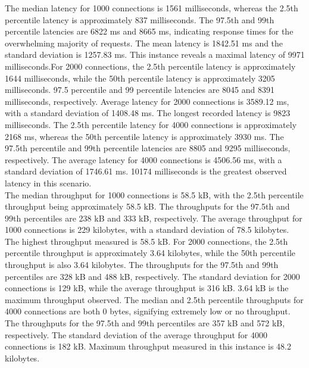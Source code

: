 \documentclass[../Main.tex]{subfiles}
\begin{document}
The median latency for 1000 connections is 1561 milliseconds, whereas the 2.5th percentile latency is approximately 837 milliseconds. The 97.5th and 99th percentile latencies are 6822 ms and 8665 ms, indicating response times for the overwhelming majority of requests. The mean latency is 1842.51 ms and the standard deviation is 1257.83 ms. This instance reveals a maximal latency of 9971 milliseconds.For 2000 connections, the 2.5th percentile latency is approximately 1644 milliseconds, while the 50th percentile latency is approximately 3205 milliseconds. 97.5 percentile and 99 percentile latencies are 8045 and 8391 milliseconds, respectively. Average latency for 2000 connections is 3589.12 ms, with a standard deviation of 1408.48 ms. The longest recorded latency is 9823 milliseconds. The 2.5th percentile latency for 4000 connections is approximately 2168 ms, whereas the 50th percentile latency is approximately 3930 ms. The 97.5th percentile and 99th percentile latencies are 8805 and 9295 milliseconds, respectively. The average latency for 4000 connections is 4506.56 ms, with a standard deviation of 1746.61 ms. 10174 milliseconds is the greatest observed latency in this scenario.\\
\indent The median throughput for 1000 connections is 58.5 kB, with the 2.5th percentile throughput being approximately 58.5 kB. The throughputs for the 97.5th and 99th percentiles are 238 kB and 333 kB, respectively. The average throughput for 1000 connections is 229 kilobytes, with a standard deviation of 78.5 kilobytes. The highest throughput measured is 58.5 kB. For 2000 connections, the 2.5th percentile throughput is approximately 3.64 kilobytes, while the 50th percentile throughput is also 3.64 kilobytes. The throughputs for the 97.5th and 99th percentiles are 328 kB and 488 kB, respectively. The standard deviation for 2000 connections is 129 kB, while the average throughput is 316 kB. 3.64 kB is the maximum throughput observed. The median and 2.5th percentile throughputs for 4000 connections are both 0 bytes, signifying extremely low or no throughput. The throughputs for the 97.5th and 99th percentiles are 357 kB and 572 kB, respectively. The standard deviation of the average throughput for 4000 connections is 182 kB. Maximum throughput measured in this instance is 48.2 kilobytes.\\
\end{document}
